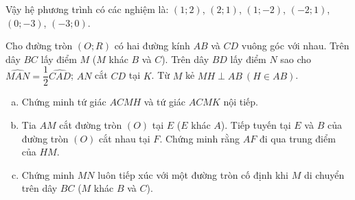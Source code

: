 \begin{ex}
{
Vậy hệ phương trình có các nghiệm là: $(1;2)$, $(2;1)$, $(1;-2)$, $(-2;1)$, $(0;-3)$, $(-3;0)$.}
\end{ex}

\begin{ex}%
	Cho đường tròn $(O;R)$ có hai đường kính $AB$ và $CD$ vuông góc với nhau. Trên dây $BC$ lấy điểm $M$ ($M$ khác $B$ và $C$). Trên dây $BD$ lấy điểm $N$ sao cho $\widehat{MAN}=\dfrac{1}{2}\widehat{CAD}$; $AN$ cắt $CD$ tại $K$. Từ $M$ kẻ $MH\perp AB\: (H\in AB)$.
	\begin{enumerate}[a)]
		\item Chứng minh tứ giác $ACMH$ và tứ giác $ACMK$ nội tiếp.
		\item Tia $AM$ cắt đường tròn $(O)$ tại $E$ ($E$ khác $A$). Tiếp tuyến tại $E$ và $B$ của đường tròn $(O)$ cắt nhau tại $F$. Chứng minh rằng $AF$ đi qua trung điểm của $HM$.
		\item Chứng minh $MN$ luôn tiếp xúc với một đường tròn cố định khi $M$ di chuyển trên dây $BC$ ($M$ khác $B$ và $C$).
	\end{enumerate}
\end{ex}
